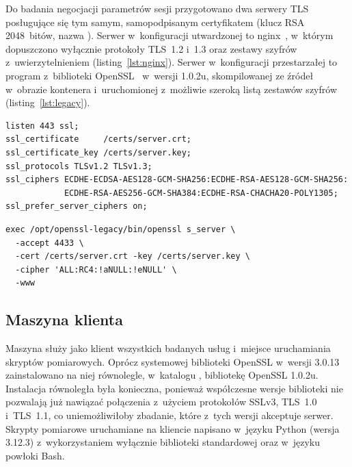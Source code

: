 Do badania negocjacji parametrów sesji przygotowano dwa serwery TLS posługujące się tym samym, samopodpisanym certyfikatem (klucz RSA 2048~bitów, nazwa ). Serwer w~konfiguracji utwardzonej to nginx~\cite{nginxssl}, w~którym dopuszczono wyłącznie protokoły TLS~1.2 i~1.3 oraz zestawy szyfrów z~uwierzytelnieniem (listing~\ref{lst:nginx}). Serwer w~konfiguracji przestarzałej to program  z~biblioteki OpenSSL~\cite{openssl} w~wersji 1.0.2u, skompilowanej ze źródeł w~obrazie kontenera i~uruchomionej z~możliwie szeroką listą zestawów szyfrów (listing~\ref{lst:legacy}).

\begin{lstlisting}[float=htbp,language={},caption={Konfiguracja protokołów i~szyfrów serwera utwardzonego (\kod{nginx.conf}, fragment)},label={lst:nginx}]
listen 443 ssl;
ssl_certificate     /certs/server.crt;
ssl_certificate_key /certs/server.key;
ssl_protocols TLSv1.2 TLSv1.3;
ssl_ciphers ECDHE-ECDSA-AES128-GCM-SHA256:ECDHE-RSA-AES128-GCM-SHA256:
            ECDHE-RSA-AES256-GCM-SHA384:ECDHE-RSA-CHACHA20-POLY1305;
ssl_prefer_server_ciphers on;
\end{lstlisting}

\begin{lstlisting}[float=htbp,language={},caption={Uruchomienie serwera w~konfiguracji przestarzałej (\kod{entrypoint.sh})},label={lst:legacy}]
exec /opt/openssl-legacy/bin/openssl s_server \
  -accept 4433 \
  -cert /certs/server.crt -key /certs/server.key \
  -cipher 'ALL:RC4:!aNULL:!eNULL' \
  -www
\end{lstlisting}

\subsection{Maszyna klienta}\label{sec:klient}

Maszyna  służy jako klient wszystkich badanych usług i~miejsce uruchamiania skryptów pomiarowych. Oprócz systemowej biblioteki OpenSSL w~wersji 3.0.13 zainstalowano na niej równolegle, w~katalogu , bibliotekę OpenSSL 1.0.2u. Instalacja równoległa była konieczna, ponieważ współczesne wersje biblioteki nie pozwalają już nawiązać połączenia z~użyciem protokołów SSLv3, TLS~1.0 i~TLS~1.1, co uniemożliwiłoby zbadanie, które z~tych wersji akceptuje serwer. Skrypty pomiarowe uruchamiane na kliencie napisano w~języku Python (wersja 3.12.3) z~wykorzystaniem wyłącznie biblioteki standardowej oraz w~języku powłoki Bash.

